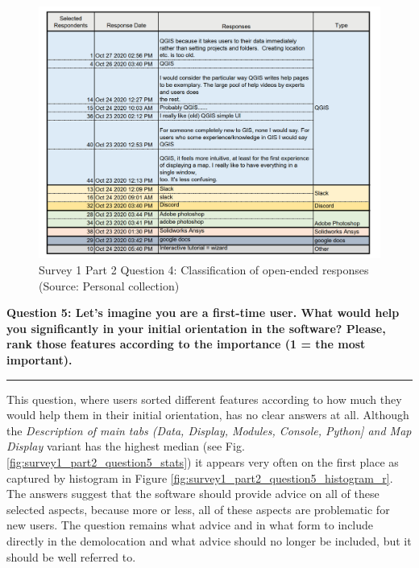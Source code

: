 \documentclass[a4paper,10pt,twoside]{article}
\begin{document}
\vspace{0.3cm}
\begin{figure}[hbt!] 
\begin{center}
\includegraphics[width=16cm]{../surveys/analyzed_data/survey1_part2_question4_open_ended_1.png} 
\caption[Survey 1 Part 2 Question 4: Classification of open-ended responses]{Survey 1 Part 2 Question 4: Classification of open-ended responses (Source: Personal collection)}
\label{fig:survey1_part2_question4_open_ended_1}
\end{center}
\end{figure}

\newpage
\noindent \textbf{Question 5: Let's imagine you are a first-time user. What would help you significantly in your initial orientation in the software? Please, rank those features according to the importance (1 = the most important).}
\par\noindent\rule{\textwidth}{0.4pt}
\noindent This question, where users sorted different features according to how much they would help them in their initial orientation, has no clear answers at all. Although the \textit{Description of main tabs (Data, Display, Modules, Console, Python] and Map Display} variant has the highest median (see Fig. \ref{fig:survey1_part2_question5_stats}) it appears very often on the first place as captured by histogram in Figure \ref{fig:survey1_part2_question5_histogram_r}. The answers suggest that the software should provide advice on all of these selected aspects, because more or less, all of these aspects are problematic for new users. The question remains what advice and in what form to include directly in the demolocation and what advice should no longer be included, but it should be well referred to.
    
\end{document}
